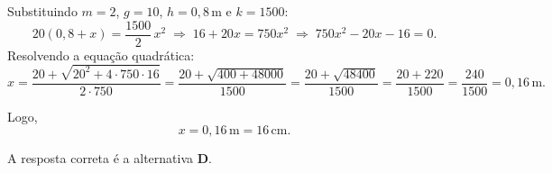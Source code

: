 \begin{flushleft}
Substituindo $m=2$, $g=10$, $h=0{,}8\,\text{m}$ e $k=1500$:
\[
20(0{,}8+x)=\frac{1500}{2}\,x^2
\;\Longrightarrow\;
16+20x=750x^2
\;\Longrightarrow\;
750x^2-20x-16=0.
\]
Resolvendo a equação quadrática:
\[
x=\frac{20+\sqrt{20^2+4\cdot 750\cdot 16}}{2\cdot 750}
=\frac{20+\sqrt{400+48000}}{1500}
=\frac{20+\sqrt{48400}}{1500}
=\frac{20+220}{1500}
=\frac{240}{1500}=0{,}16\,\text{m}.
\]

Logo,
\[
\boxed{x=0{,}16\,\text{m}=16\,\text{cm}}.
\]

\medskip
A resposta correta é a alternativa \colorbox{green!50}{\textbf{D}}.

\end{flushleft}


%
%
%
%
%
%
%
%
